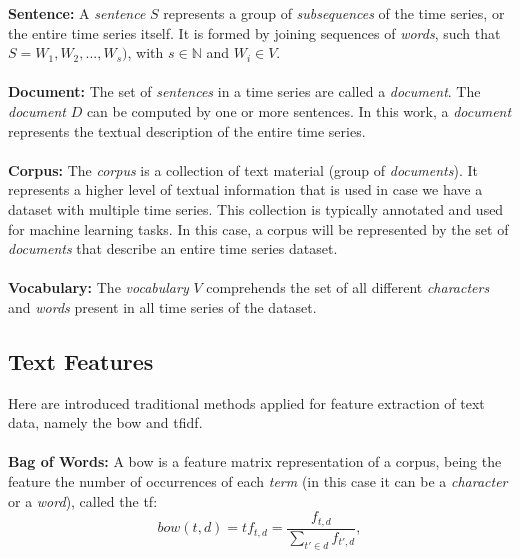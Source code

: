 \textbf{Sentence:} A \textit{sentence} $S$ represents a group of \textit{subsequences} of the time series, or the entire time series itself. It is formed by joining sequences of \textit{words}, such that $S = W_1, W_2, ..., W_s)$, with $s \in \mathbb{N}$ and $W_i \in V$.\\\\
\textbf{Document:} The set of \textit{sentences} in a time series are called a \textit{document}. The \textit{document} $D$ can be computed by one or more sentences. In this work, a \textit{document} represents the textual description of the entire time series.\\\\
\textbf{Corpus:} The \textit{corpus} is a collection of text material (group of \textit{documents}). It represents a higher level of textual information that is used in case we have a dataset with multiple time series. This collection is typically annotated and used for machine learning tasks. In this case, a corpus will be represented by the set of \textit{documents} that describe an entire time series dataset.\\\\
\textbf{Vocabulary:} The \textit{vocabulary} $V$ comprehends the set of all different \textit{characters} and \textit{words} present in all time series of the dataset.\\

\subsection{Text Features}
\label{subsec:text_features}

Here are introduced traditional methods applied for feature extraction of text data, namely the \gls{bow} and  \gls{tfidf}.\\\\
\textbf{Bag of Words:} A \gls{bow} is a feature matrix representation of a corpus, being the feature the number of occurrences of each \textit{term} (in this case it can be a \textit{character} or a \textit{word}), called the \gls{tf}:
\begin{equation}
\label{eq:tf}
    bow(t,d) = tf_{t, d} = \frac{f_{t,d}}{\sum\limits_{t'\in d} f_{t',d}}, 
\end{equation}

